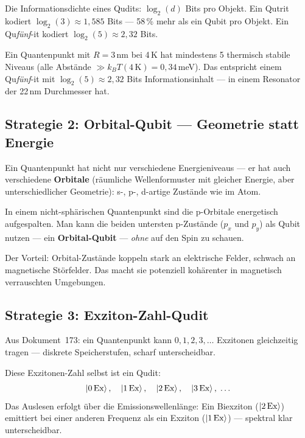 Die Informationsdichte eines Qudits:
$\log_2(d)$ Bits pro Objekt.
Ein Qutrit kodiert $\log_2(3) \approx 1{,}585$ Bits ---
58\,\% mehr als ein Qubit pro Objekt.
Ein Qu\textit{fünf}-it kodiert $\log_2(5) \approx 2{,}32$ Bits.

\begin{keyresult}
Ein Quantenpunkt mit $R = 3$\,nm bei 4\,K
hat mindestens 5 thermisch stabile Niveaus
(alle Abstände $\gg k_BT(4\,\text{K}) = 0{,}34$\,meV).
Das entspricht einem Qu\textit{fünf}-it mit
$\log_2(5) \approx 2{,}32$ Bits Informationsinhalt ---
in einem Resonator der 22\,nm Durchmesser hat.
\end{keyresult}

\subsection{Strategie 2: Orbital-Qubit --- Geometrie statt Energie}
\label{sec:orbital}

Ein Quantenpunkt hat nicht nur verschiedene Energieniveaus ---
er hat auch verschiedene \textbf{Orbitale} (räumliche
Wellenformuster mit gleicher Energie, aber unterschiedlicher
Geometrie): s-, p-, d-artige Zustände wie im Atom.

In einem nicht-sphärischen Quantenpunkt sind die
p-Orbitale energetisch aufgespalten.
Man kann die beiden untersten p-Zustände ($p_x$ und $p_y$)
als Qubit nutzen --- ein \textbf{Orbital-Qubit} ---
\emph{ohne} auf den Spin zu schauen.

Der Vorteil: Orbital-Zustände koppeln stark an elektrische
Felder, schwach an magnetische Störfelder.
Das macht sie potenziell kohärenter in magnetisch
verrauschten Umgebungen.

\subsection{Strategie 3: Exziton-Zahl-Qudit}
\label{sec:exziton-qudit}

Aus Dokument~173: ein Quantenpunkt kann $0, 1, 2, 3, \ldots$
Exzitonen gleichzeitig tragen --- diskrete Speicherstufen,
scharf unterscheidbar.

Diese Exzitonen-Zahl selbst ist ein Qudit:
\[
  \left|0\,\text{Ex}\right\rangle,\quad
  \left|1\,\text{Ex}\right\rangle,\quad
  \left|2\,\text{Ex}\right\rangle,\quad
  \left|3\,\text{Ex}\right\rangle,\;\ldots
\]
Das Auslesen erfolgt über die Emissionswellenlänge:
Ein Biexziton ($\left|2\,\text{Ex}\right\rangle$) emittiert bei einer
anderen Frequenz als ein Exziton ($\left|1\,\text{Ex}\right\rangle$)
--- spektral klar unterscheidbar.


